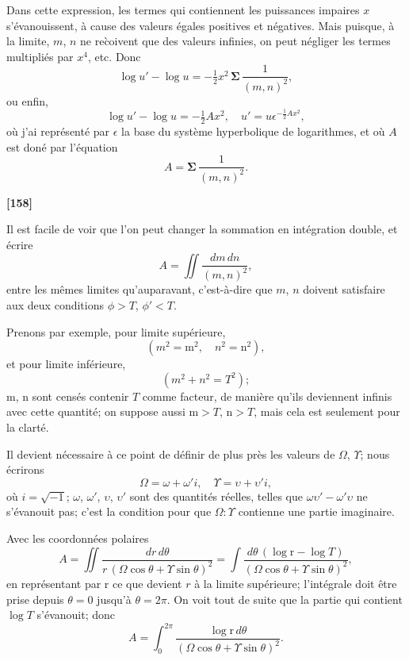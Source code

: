 \documentclass[11pt,a4paper]{article}
\begin{document}
Dans cette expression, les termes qui contiennent les puissances impaires $x$ s'\'evanouissent,
\`a cause des valeurs \'egales positives et n\'egatives. Mais puisque, \`a la limite, $m$, $n$ ne
re\`coivent que des valeurs infinies, on peut n\'egliger les termes multipli\'es par $x^4$, etc.
Donc
\[\log u' - \log u = -\tfrac{1}{2} x^2\, \boldsymbol{\Sigma}\, \frac{1}{(m, n)^2},\]
ou enfin,
\begin{equation}
\log u' - \log u = -\tfrac{1}{2}Ax^2,\quad u' = u\epsilon^{-\frac{1}{2}Ax^2}, \tag{3}
\end{equation}
o\`u j'ai repr\'esent\'e par $\epsilon$ la base du syst\`eme hyperbolique de logarithmes, et o\`u $A$ est
don\'e par l'\'equation
\begin{equation}
A = \boldsymbol{\Sigma}\, \frac{1}{(m, n)^2}. \tag{4}
\end{equation}

\textbf{[158]}

Il est facile de voir que l'on peut changer la sommation en int\'egration double, et \'ecrire
\begin{equation}
A = \iint \frac{dm\, dn}{(m, n)^2}, \tag{5}
\end{equation}
entre les m\^emes limites qu'auparavant, c'est-\`a-dire que $m$, $n$ doivent satisfaire aux
deux conditions $\phi > T$, $\phi' < T$.

Prenons par exemple, pour limite sup\'erieure,
\[(m^2 = \mathrm{m}^2,\quad n^2 = \mathrm{n}^2),\]
et pour limite inf\'erieure,
\[(m^2 + n^2 = T^2);\]
$\mathrm{m}$, $\mathrm{n}$ sont cens\'es contenir $T$ comme facteur, de mani\`ere qu'ils deviennent infinis avec
cette quantit\'e; on suppose aussi $\mathrm{m} > T$, $\mathrm{n} > T$, mais cela est seulement pour la clart\'e.

Il devient n\'ecessaire \`a ce point de d\'efinir de plus pr\`es les valeurs de $\Omega$, $\Upsilon$; nous
\'ecrirons
\begin{equation}
\Omega = \omega + \omega'i,\quad \Upsilon = \upsilon + \upsilon'i, \tag{6}
\end{equation}
o\`u $i = \sqrt{-1}$; $\omega$, $\omega'$, $\upsilon$, $\upsilon'$ sont des quantit\'es r\'eelles, telles que $\omega\upsilon' - \omega'\upsilon$ ne s'\'evanouit
pas; c'est la condition pour que $\Omega : \Upsilon$ contienne une partie imaginaire.

Avec les coordonn\'ees polaires
\begin{equation}
A = \iint \frac{dr\, d\theta}{r\, (\Omega\cos\theta + \Upsilon\sin\theta)^2}
= \int \frac{d\theta\, (\log \mathrm{r} - \log T)}{(\Omega\cos\theta + \Upsilon\sin\theta)^2}, \tag{7}
\end{equation}
en repr\'esentant par $\mathrm{r}$ ce que devient $r$ \`a la limite sup\'erieure; l'int\'egrale doit \^etre
prise depuis $\theta = 0$ jusqu'\`a $\theta = 2\pi$. On voit tout de suite que la partie qui contient
$\log T$ s'\'evanouit; donc
\[A = \int_0^{2\pi} \frac{\log \mathrm{r}\, d\theta}{(\Omega\cos\theta + \Upsilon\sin\theta)^2}.\]
\end{document}
